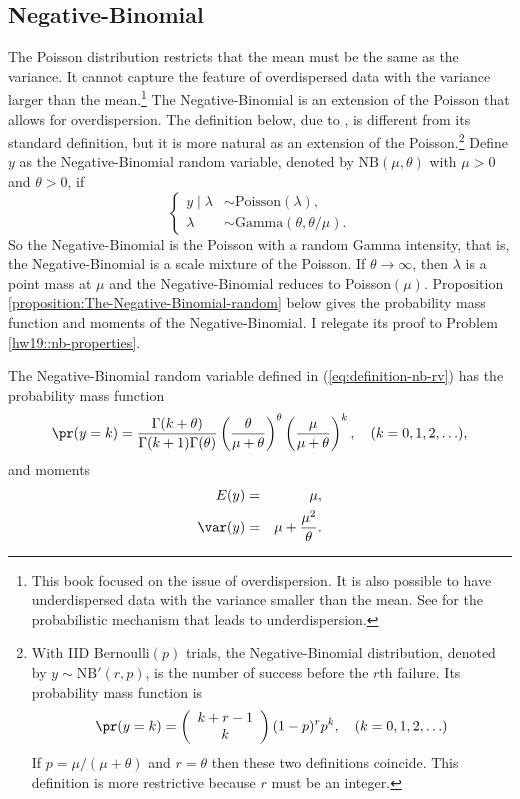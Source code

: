 \subsection{Negative-Binomial}

The Poisson distribution restricts that the mean must be the same
as the variance. It cannot capture the feature of overdispersed data
with the variance larger than the mean.\footnote{
This book focused on the issue of overdispersion. 
It is also possible to have underdispersed data with the variance smaller than the mean. See \citet{puig2023some} for the probabilistic mechanism that leads to underdispersion. 
} The Negative-Binomial is an extension
of the Poisson that allows for overdispersion. The definition below, due to \citet{fisher1943relation}, is different from its standard definition, but it is more natural as an extension of the Poisson.\footnote{With IID Bernoulli$(p)$ trials, the Negative-Binomial distribution,
denoted by $y\sim\text{NB}'(r,p)$, is the number of success before
the $r$th failure. 
Its probability mass function is
\[
\pr(y=k)=\left(\begin{array}{c}
k+r-1\\
k
\end{array}\right)(1-p)^{r}p^{k},\quad(k=0,1,2,\ldots)
\]
If $p=\mu/(\mu+\theta)$ and $r=\theta$ then these two definitions
coincide. 
This definition is more restrictive because $r$ must
be an integer. } Define $y$ as the Negative-Binomial random
variable, denoted by $\text{NB}(\mu,\theta)$ with $\mu>0$ and $\theta>0$,
if 
\begin{equation}
\begin{cases}
y\mid\lambda & \sim\text{Poisson}(\lambda),\\
\lambda & \sim\text{Gamma}(\theta,\theta/\mu).
\end{cases}\label{eq:definition-nb-rv}
\end{equation}
So the Negative-Binomial is the Poisson with a random Gamma intensity, that is, the Negative-Binomial is a scale mixture of the Poisson. If $\theta\rightarrow\infty$, then $\lambda$ is a point mass at $\mu$ and the Negative-Binomial reduces to Poisson$(\mu)$. Proposition \ref{proposition:The-Negative-Binomial-random} below gives the probability mass function and moments of the Negative-Binomial. I relegate its proof to Problem \ref{hw19::nb-properties}. 


\begin{proposition}
\label{proposition:The-Negative-Binomial-random}The Negative-Binomial random
variable defined in (\ref{eq:definition-nb-rv}) has the probability
mass function
\[
\pr(y=k)=\frac{\Gamma(k+\theta)}{\Gamma(k+1)\Gamma(\theta)}\left(\frac{\theta}{\mu+\theta}\right)^{\theta}\left(\frac{\mu}{\mu+\theta}\right)^{k},\quad(k=0,1,2,\ldots),
\]
and moments
\begin{eqnarray*}
E(y)    &=& \mu,\\
\var(y) &=& \mu+\frac{\mu^{2}}{\theta} . 
\end{eqnarray*}
\end{proposition}

